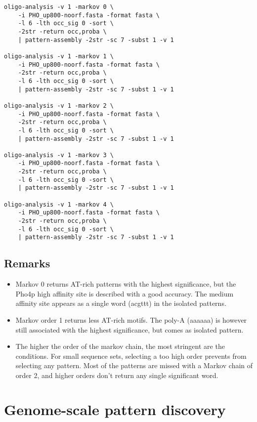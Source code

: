 {\color{Blue} \begin{footnotesize} 
\begin{verbatim}
oligo-analysis -v 1 -markov 0 \
    -i PHO_up800-noorf.fasta -format fasta \
    -l 6 -lth occ_sig 0 -sort \
    -2str -return occ,proba \
    | pattern-assembly -2str -sc 7 -subst 1 -v 1

oligo-analysis -v 1 -markov 1 \
    -i PHO_up800-noorf.fasta -format fasta \
    -2str -return occ,proba \
    -l 6 -lth occ_sig 0 -sort \
    | pattern-assembly -2str -sc 7 -subst 1 -v 1
	
oligo-analysis -v 1 -markov 2 \
    -i PHO_up800-noorf.fasta -format fasta \
    -2str -return occ,proba \
    -l 6 -lth occ_sig 0 -sort \
    | pattern-assembly -2str -sc 7 -subst 1 -v 1
	
oligo-analysis -v 1 -markov 3 \
    -i PHO_up800-noorf.fasta -format fasta \
    -2str -return occ,proba \
    -l 6 -lth occ_sig 0 -sort \
    | pattern-assembly -2str -sc 7 -subst 1 -v 1
	
oligo-analysis -v 1 -markov 4 \
    -i PHO_up800-noorf.fasta -format fasta \
    -2str -return occ,proba \
    -l 6 -lth occ_sig 0 -sort \
    | pattern-assembly -2str -sc 7 -subst 1 -v 1
\end{verbatim} \end{footnotesize}
}


\subsection{Remarks}

\begin{itemize}
\item Markov 0 returns AT-rich patterns with the highest significance,
  but the Pho4p high affinity site is described with a good
  accuracy. The medium affinity site appears as a single word (acgttt)
  in the isolated patterns.
\item Markov order 1 returns less AT-rich motifs. The poly-A (aaaaaa)
  is however still associated with the highest significance, but comes
  as isolated pattern.
\item The higher the order of the markov chain, the most stringent are
  the conditions. For small sequence sets, selecting a too high order
  prevents from selecting any pattern. Most of the patterns are missed
  with a Markov chain of order 2, and higher orders don't return any
  single significant word.
\end{itemize}


\section{Genome-scale pattern discovery}

